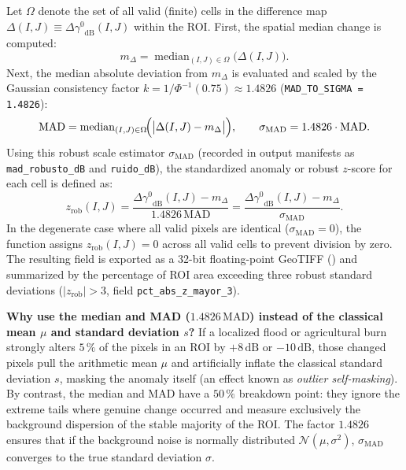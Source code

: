 \documentclass[11pt,a4paper]{article}
\newcommand{\unit}[1]{\mathrm{#1}}
\newcommand{\gz}{\ensuremath{\gamma^{0}}}
\begin{document}
Let $\Omega$ denote the set of all valid (finite) cells in the difference map $\Delta(I,J) \equiv \Delta\gz_{\mathrm{dB}}(I,J)$ within the ROI. First, the spatial median change is computed:
\begin{equation}
  m_{\Delta} = \operatorname{median}_{(I,J)\in\Omega}\!\bigl(\Delta(I,J)\bigr).
  \label{eq:cambio-mediana}
\end{equation}
Next, the median absolute deviation from $m_{\Delta}$ is evaluated and scaled by the Gaussian consistency factor $k = 1 / \Phi^{-1}(0.75) \approx 1.4826$ (\texttt{MAD\_TO\_SIGMA = 1.4826}):
\begin{equation}
  \mathrm{MAD} = \operatorname{median}_{(I,J)\in\Omega}\!\Bigl(\bigl|\Delta(I,J) - m_{\Delta}\bigr|\Bigr),
  \qquad
  \sigma_{\mathrm{MAD}} = 1.4826 \cdot \mathrm{MAD}.
  \label{eq:cambio-mad-sigma}
\end{equation}
Using this robust scale estimator $\sigma_{\mathrm{MAD}}$ (recorded in output manifests as \texttt{mad\_robusto\_dB} and \texttt{ruido\_dB}), the standardized anomaly or robust $z$-score for each cell is defined as:
\begin{equation}
  z_{\mathrm{rob}}(I,J) = \frac{\Delta\gz_{\mathrm{dB}}(I,J) - m_{\Delta}}{1.4826\,\mathrm{MAD}}
  = \frac{\Delta\gz_{\mathrm{dB}}(I,J) - m_{\Delta}}{\sigma_{\mathrm{MAD}}}.
  \label{eq:cambio-z-robusto}
\end{equation}
In the degenerate case where all valid pixels are identical ($\sigma_{\mathrm{MAD}} = 0$), the function assigns $z_{\mathrm{rob}}(I,J) = 0$ across all valid cells to prevent division by zero. The resulting field is exported as a 32-bit floating-point GeoTIFF () and summarized by the percentage of ROI area exceeding three robust standard deviations ($|z_{\mathrm{rob}}| > 3$, field \texttt{pct\_abs\_z\_mayor\_3}).

\begin{intuicion}
\textbf{Why use the median and MAD ($1.4826\,\mathrm{MAD}$) instead of the classical mean $\mu$ and standard deviation $s$?}
If a localized flood or agricultural burn strongly alters $5\,\text{\%}$ of the pixels in an ROI by $+8\,\unit{dB}$ or $-10\,\unit{dB}$, those changed pixels pull the arithmetic mean $\mu$ and artificially inflate the classical standard deviation $s$, masking the anomaly itself (an effect known as \emph{outlier self-masking}). By contrast, the median and MAD have a $50\,\text{\%}$ breakdown point: they ignore the extreme tails where genuine change occurred and measure exclusively the background dispersion of the stable majority of the ROI. The factor $1.4826$ ensures that if the background noise is normally distributed $\mathcal{N}(\mu, \sigma^2)$, $\sigma_{\mathrm{MAD}}$ converges to the true standard deviation $\sigma$.
\end{intuicion}
\end{document}
